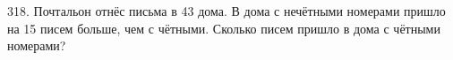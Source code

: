 318. Почтальон отнёс письма в 43 дома. В дома с нечётными номерами пришло на 15 писем больше, чем с чётными. Сколько писем пришло в дома с чётными номерами?\\

